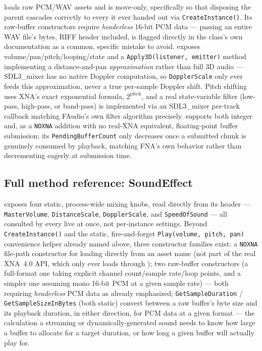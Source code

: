  loads raw PCM/WAV assets and is move-only, specifically so that
disposing the parent cascades correctly to every  it ever
handed out via \texttt{CreateInstance()}. Its raw-buffer constructors require
\emph{headerless} 16-bit PCM data --- passing an entire WAV file's bytes, RIFF header
included, is flagged directly in the class's own documentation as a common, specific mistake
to avoid.  exposes volume/pan/pitch/looping/state and a
\texttt{Apply3D(listener, emitter)} method implementing a distance-and-pan
\emph{approximation} rather than full 3D audio --- SDL3\_mixer has no native Doppler
computation, so \texttt{DopplerScale} only ever feeds this approximation, never a true
per-sample Doppler shift. Pitch shifting uses XNA's exact exponential formula,
$2^{\text{pitch}}$, and a real state-variable filter (low-pass, high-pass, or band-pass) is
implemented via an SDL3\_mixer per-track callback matching FAudio's own filter algorithm
precisely.  supports both integer and, as a
\texttt{NOXNA} addition with no real-XNA equivalent, floating-point buffer submission; its
\texttt{PendingBufferCount} only decreases once a submitted chunk is genuinely consumed by
playback, matching FNA's own behavior rather than decrementing eagerly at submission time.

\subsection{Full method reference: SoundEffect}

 exposes four static, process-wide mixing knobs, read directly from its
header --- \texttt{MasterVolume}, \texttt{DistanceScale}, \texttt{DopplerScale}, and
\texttt{SpeedOfSound} --- all consulted by every live  at once,
not per-instance settings. Beyond \texttt{CreateInstance()} and the static, fire-and-forget
\texttt{Play(volume, pitch, pan)} convenience helper already named above, three constructor
families exist: a \texttt{NOXNA} file-path constructor for loading directly from an asset name
(not part of the real XNA~4.0 API, which only ever loads through
); two raw-buffer constructors (a full-format one taking explicit
channel count/sample rate/loop points, and a simpler one assuming mono 16-bit PCM at a given
sample rate) --- both requiring \emph{headerless} PCM data as already emphasized;
\texttt{GetSampleDuration} / \texttt{GetSampleSizeInBytes} (both static) convert between a raw
buffer's byte size and its playback duration, in either direction, for PCM data at a given
format --- the calculation a streaming or dynamically-generated sound needs to know how large
a buffer to allocate for a target duration, or how long a given buffer will actually play for.

